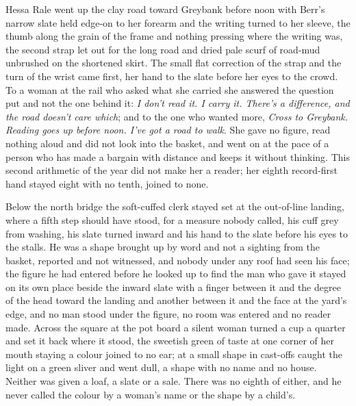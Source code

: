 Hessa Rale went up the clay road toward Greybank before noon with Berr's narrow slate held edge-on to her forearm and the writing turned to her sleeve, the thumb along the grain of the frame and nothing pressing where the writing was, the second strap let out for the long road and dried pale scurf of road-mud unbrushed on the shortened skirt. The small flat correction of the strap and the turn of the wrist came first, her hand to the slate before her eyes to the crowd. To a woman at the rail who asked what she carried she answered the question put and not the one behind it: \emph{I don't read it. I carry it. There's a difference, and the road doesn't care which}; and to the one who wanted more, \emph{Cross to Greybank. Reading goes up before noon. I've got a road to walk}. She gave no figure, read nothing aloud and did not look into the basket, and went on at the pace of a person who has made a bargain with distance and keeps it without thinking. This second arithmetic of the year did not make her a reader; her eighth record-first hand stayed eight with no tenth, joined to none.

Below the north bridge the soft-cuffed clerk stayed set at the out-of-line landing, where a fifth step should have stood, for a measure nobody called, his cuff grey from washing, his slate turned inward and his hand to the slate before his eyes to the stalls. He was a shape brought up by word and not a sighting from the basket, reported and not witnessed, and nobody under any roof had seen his face; the figure he had entered before he looked up to find the man who gave it stayed on its own place beside the inward slate with a finger between it and the degree of the head toward the landing and another between it and the face at the yard's edge, and no man stood under the figure, no room was entered and no reader made. Across the square at the pot board a silent woman turned a cup a quarter and set it back where it stood, the sweetish green of taste at one corner of her mouth staying a colour joined to no ear; at  a small shape in cast-offs caught the light on a green sliver and went dull, a shape with no name and no house. Neither was given a loaf, a slate or a sale. There was no eighth of either, and he never called the colour by a woman's name or the shape by a child's.

